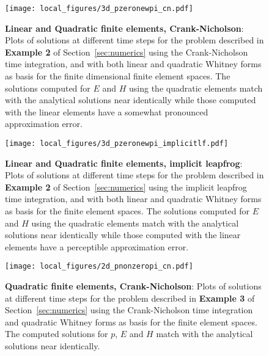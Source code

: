 \documentclass{amsart}
\theoremstyle{thmstyleone}%
\theoremstyle{thmstyletwo}%
\theoremstyle{thmstylethree}%
\begin{document}
\vspace{\fill}
\begin{figure}[h]
  \centering
  \texttt{[image: local\_figures/3d\_pzeronewpi\_cn.pdf]}
  \caption{\textbf{Linear and Quadratic finite elements, Crank-Nicholson}: Plots of solutions at different time steps for the problem described in \textbf{Example 2} of Section~\ref{sec:numerics} using the Crank-Nicholson time integration, and with both linear and quadratic Whitney forms as basis for the finite dimensional finite element spaces. The solutions computed for $E$ and $H$ using the quadratic elements match with the analytical solutions near identically while those computed with the linear elements have a somewhat pronounced approximation error.}
  \label{fig:example2_cn}
\end{figure}
\vspace{\fill}
\clearpage

\vspace{\fill}
\begin{figure}[h]
  \centering
  \texttt{[image: local\_figures/3d\_pzeronewpi\_implicitlf.pdf]}
  \caption{\textbf{Linear and Quadratic finite elements, implicit leapfrog}: Plots of solutions at different time steps for the problem described in \textbf{Example 2} of Section~\ref{sec:numerics} using the implicit leapfrog time integration, and with both linear and quadratic Whitney forms as basis for the finite element spaces. The solutions computed for $E$ and $H$ using the quadratic elements match with the analytical solutions near identically while those computed with the linear elements have a perceptible approximation error.}
  \label{fig:example2_lf}
\end{figure}
\vspace{\fill}
\clearpage


\vspace{\fill}
\begin{figure}[h]
  \centering
  \texttt{[image: local\_figures/2d\_pnonzeropi\_cn.pdf]}
  \caption{\textbf{Quadratic finite elements, Crank-Nicholson}: Plots of solutions at different time steps for the problem described in \textbf{Example 3} of Section~\ref{sec:numerics} using the Crank-Nicholson time integration and quadratic Whitney forms as basis for the finite element spaces. The computed solutions for $p$, $E$ and $H$ match with the analytical solutions near identically.}
  \label{fig:example3_cn}
\end{figure}
\vspace{\fill}
\clearpage
\end{document}
